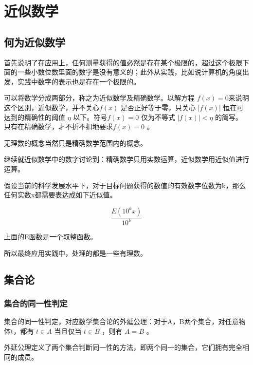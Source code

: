 \documentclass[12pt,oneside]{book}
\begin{document}
 












\part{近似数学}
\chapter{何为近似数学}
\cite{高观点下的初等数学第一卷}首先说明了在应用上，任何测量获得的值必然是存在某个极限的，超过这个极限下面的一些小数位数里面的数字是没有意义的；此外从实践，比如说计算机的角度出发，实践中数字的表示也是存在一个极限的。

\begin{bookref}[frametitle={\cite{高观点下的初等数学第一卷}}]
可以将数学分成两部分，称之为近似数学及精确数学。以解方程 $f(x) = 0$来说明这个区别，近似数学，并不关心$f(x)$ 是否正好等于零，只关心 $|f(x)|$ 恒在可达到的精确性的阈值 $\eta$ 以下。符号$f(x)=0$ 仅为不等式 $|f(x)| < \eta$ 的简写。只有在精确数学，才不折不扣地要求$f(x)=0$ 。


无理数的概念当然只是精确数学范围内的概念。
\end{bookref}


\cite{高观点下的初等数学第三卷}继续就近似数学中的数字讨论到：精确数学只用实数运算，近似数学用近似值进行运算。

假设当前的科学发展水平下，对于目标问题获得的数值的有效数字位数为k，那么任何实数x都需要表达成如下近似值。

\[
\frac{E(10^k x)}{10^k}
\]

上面的E函数是一个取整函数。

所以最终应用实践中，处理的都是一些有理数。







\chapter{集合论}
\section{集合的同一性判定}
集合的同一性判定，对应数学集合论的外延公理：对于A，B两个集合，对任意物体t，都有 $t \in A$ 当且仅当 $t \in B$ ，则有 $A=B$ 。

外延公理定义了两个集合判断同一性的方法，即两个同一的集合，它们拥有完全相同的成员。
\end{document}
